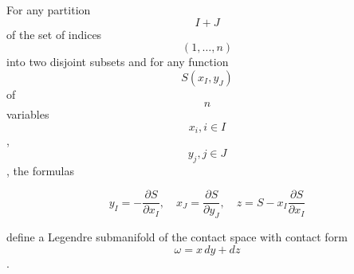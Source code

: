 For any partition $$I + J$$ of the set of indices $$(1, \ldots, n)$$ into two disjoint subsets and for any function $$S(x_I, y_J)$$ of $$n$$ variables $$x_i, i \in I$$, $$y_j, j \in J$$, the formulas

$$y_I = -\frac{\partial S}{\partial x_I}, \quad x_J = \frac{\partial S}{\partial y_J}, \quad z = S - x_I\frac{\partial S}{\partial x_I}$$

define a Legendre submanifold of the contact space with contact form $$\omega = x\,dy + dz$$.
